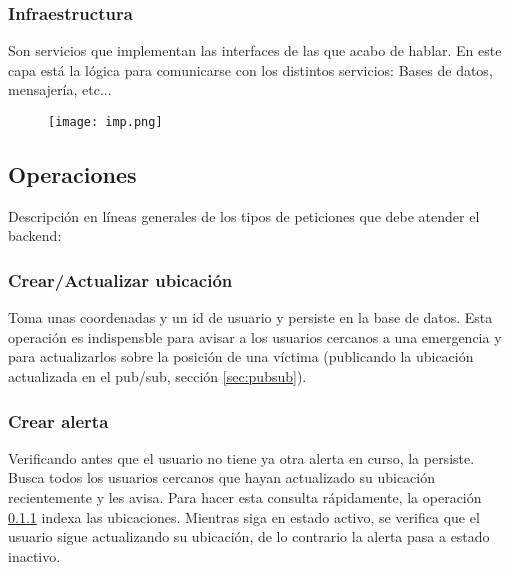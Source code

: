 \subsubsection{Infraestructura} 
Son servicios que implementan las interfaces de las que acabo de hablar.
En este capa está la lógica para comunicarse con los distintos servicios: Bases de datos, mensajería, etc...
\begin{figure}[H]
	\centering	
	\texttt{[image: imp.png]}
	\end{figure}


\subsection{Operaciones}

Descripción en líneas generales de los tipos de peticiones que debe atender el backend:

\subsubsection{Crear/Actualizar ubicación}\label{op:ubi}
Toma unas coordenadas y un id de usuario y persiste en la base de datos.
Esta operación es indispensble para avisar a los usuarios cercanos a una emergencia y para 
actualizarlos sobre la posición de una víctima (publicando la ubicación actualizada en el pub/sub, sección \ref{sec:pubsub}).

\subsubsection{Crear alerta}
Verificando antes que el usuario no tiene ya otra alerta en curso, la persiste.
Busca todos los usuarios cercanos que hayan actualizado su ubicación recientemente y les avisa. Para hacer
esta consulta rápidamente, la operación \ref{op:ubi} indexa las ubicaciones.
Mientras siga en estado activo, se verifica que el usuario sigue actualizando su ubicación, de lo contrario la alerta pasa a estado inactivo.

